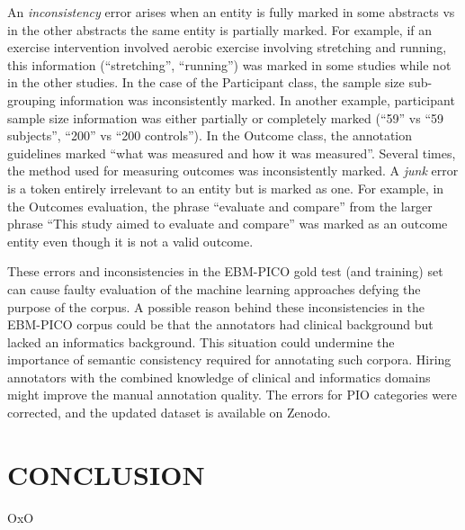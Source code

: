 \documentclass[10.7pt,]{article}
\begin{document}
An \textit{inconsistency} error arises when an entity is fully marked in some abstracts vs in the other abstracts the same entity is partially marked. 
For example, if an exercise intervention involved aerobic exercise involving stretching and running, this information (``stretching'', ``running'') was marked in some studies while not in the other studies.
In the case of the Participant class, the sample size sub-grouping information was inconsistently marked.
In another example, participant sample size information was either partially or completely marked (``59'' vs ``59 subjects'', ``200'' vs ``200 controls'').
In the Outcome class, the annotation guidelines marked ``what was measured and how it was measured''. 
Several times, the method used for measuring outcomes was inconsistently marked.
A \textit{junk} error is a token entirely irrelevant to an entity but is marked as one.
For example, in the Outcomes evaluation, the phrase ``evaluate and compare'' from the larger phrase ``This study aimed to evaluate and compare'' was marked as an outcome entity even though it is not a valid outcome.


These errors and inconsistencies in the EBM-PICO gold test (and training) set can cause faulty evaluation of the machine learning approaches defying the purpose of the corpus.
A possible reason behind these inconsistencies in the EBM-PICO corpus could be that the annotators had clinical background but lacked an informatics background.
This situation could undermine the importance of semantic consistency required for annotating such corpora.
Hiring annotators with the combined knowledge of clinical and informatics domains might improve the manual annotation quality.
The errors for PIO categories were corrected, and the updated dataset is available on Zenodo.
%
%
%
\section{CONCLUSION}\label{conclusion}
%
OxO
%
%
%
%
%
%
%
%
%
%
%


\end{document}

